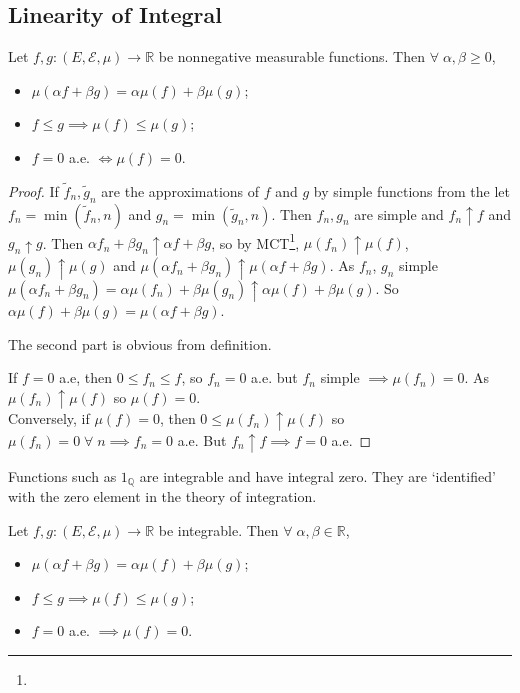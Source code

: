 \subsection{Linearity of Integral}
\begin{theorem}
	Let $f, g \colon (E, \mathcal E, \mu) \to \mathbb R$ be nonnegative measurable functions.
	Then $\forall \; \alpha, \beta \geq 0$,
	\begin{itemize}
		\item $\mu(\alpha f + \beta g) = \alpha \mu(f) + \beta \mu(g)$;
		\item $f \leq g \implies \mu(f) \leq \mu(g)$;
		\item $f = 0$ a.e. $\iff \mu(f) = 0$.
	\end{itemize}
\end{theorem}

\begin{proof}
	If $\widetilde f_n, \widetilde g_n$ are the approximations of $f$ and $g$ by simple functions from the  let $f_n = \min(\widetilde f_n, n)$ and $g_n = \min(\widetilde g_n, n)$.
	Then $f_n, g_n$ are simple and $f_n \uparrow f$ and $g_n \uparrow g$.
	Then $\alpha f_n + \beta g_n \uparrow \alpha f + \beta g$, so by MCT\footnote{}, $\mu(f_n) \uparrow \mu(f)$, $\mu(g_n) \uparrow \mu(g)$ and $\mu(\alpha f_n + \beta g_n) \uparrow \mu(\alpha f + \beta g)$.
	As $f_n$, $g_n$ simple $\mu(\alpha f_n + \beta g_n) = \alpha \mu(f_n) + \beta \mu(g_n) \uparrow \alpha \mu(f) + \beta \mu(g)$.
	So $\alpha \mu(f) + \beta \mu(g) = \mu(\alpha f + \beta g)$.

	The second part is obvious from definition.

	If $f = 0$ a.e, then $0 \leq f_n \leq f$, so $f_n = 0$ a.e. but $f_n$ simple $\implies \mu(f_n) = 0$.
	As $\mu(f_n) \uparrow \mu(f)$ so $\mu(f) = 0$. \\
	Conversely, if $\mu(f) = 0$, then $0 \leq \mu(f_n) \uparrow \mu(f)$ so $\mu(f_n) = 0 \; \forall \; n \implies f_n = 0$ a.e.
	But $f_n \uparrow f \implies f = 0$ a.e.
\end{proof}

\begin{remark}
	Functions such as $1_{\mathbb Q}$ are integrable and have integral zero.
	They are `identified' with the zero element in the theory of integration.
\end{remark}

\begin{theorem}
	Let $f, g \colon (E, \mathcal E, \mu) \to \mathbb R$ be integrable.
	Then $\forall \; \alpha, \beta \in \mathbb{R}$,
	\begin{itemize}
		\item $\mu(\alpha f + \beta g) = \alpha \mu(f) + \beta \mu(g)$;
		\item $f \leq g \implies \mu(f) \leq \mu(g)$;
		\item $f = 0$ a.e. $\implies \mu(f) = 0$.
	\end{itemize}
\end{theorem}

